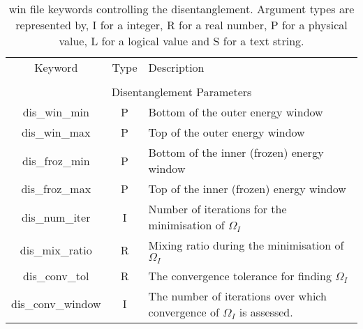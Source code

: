 \begin{table}
\begin{center}
\begin{tabular}{|c|c|p{6cm}|}
\hline
Keyword & Type & Description \\
        &      &             \\
\hline\hline
\multicolumn{3}{|c|}{Disentanglement Parameters} \\
\hline
{\sc dis\_win\_min }   & P & Bottom of the outer energy window \\
{\sc dis\_win\_max }   & P & Top of the outer energy window \\
{\sc dis\_froz\_min }   & P & Bottom of the inner (frozen) energy window \\
{\sc dis\_froz\_max }   & P & Top of the inner (frozen) energy window \\
{\sc dis\_num\_iter }   & I & Number of iterations for the minimisation
of $\Omega_{I}$ \\
{\sc dis\_mix\_ratio }   & R & Mixing ratio during the minimisation of $\Omega_{I}$\\
{\sc dis\_conv\_tol }   & R & The convergence tolerance for finding $\Omega_{I}$ \\
{\sc dis\_conv\_window }   & I & The number of iterations over which
convergence of $\Omega_{I}$ is assessed. \\ 
\hline
\end{tabular}
\caption[Parameter file keywords controlling disentanglement parameters.]
{win file keywords controlling the disentanglement.  Argument types
are represented by, I for a integer, R for a real number, P for a
physical value, L for a logical value and S for a text string.}
\label{parameter_keywords4}
\end{center}
\end{table}



